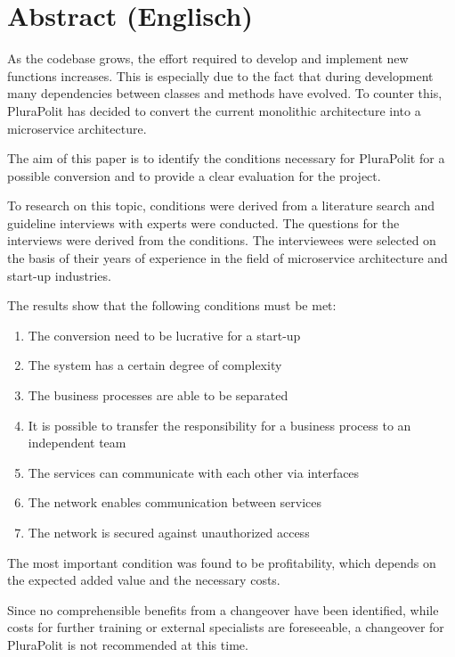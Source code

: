 \newpage

\section*{Abstract (Englisch)}

As the codebase grows, the effort required to develop and implement new functions increases. This is especially due to the fact that during development many dependencies between classes and methods have evolved. To counter this, PluraPolit has decided to convert the current monolithic architecture into a microservice architecture.

The aim of this paper is to identify the conditions necessary for PluraPolit for a possible conversion and to provide a clear evaluation for the project.

To research on this topic, conditions were derived from a literature search and guideline interviews with experts were conducted. The questions for the interviews were derived from the conditions. The interviewees were selected on the basis of their years of experience in the field of microservice architecture and start-up industries.

The results show that the following conditions must be met:
\begin{enumerate}
	\item The conversion need to be lucrative for a start-up
	\item The system has a certain degree of complexity
	\item The business processes are able to be separated
	\item It is possible to transfer the responsibility for a business process to an independent team
	\item The services can communicate with each other via interfaces
	\item The network enables communication between services
	\item The network is secured against unauthorized access
\end{enumerate}

The most important condition was found to be profitability, which depends on the expected added value and the necessary costs.

Since no comprehensible benefits from a changeover have been identified, while costs for further training or external specialists are foreseeable, a changeover for PluraPolit is not recommended at this time.
